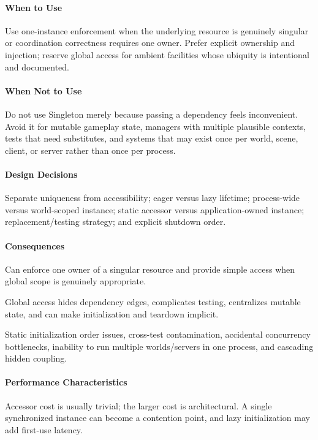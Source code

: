 \documentclass[11pt]{article}
\begin{document}
\paragraph{When to Use} Use one-instance enforcement when the underlying resource is genuinely singular or coordination correctness requires one owner. Prefer explicit ownership and injection; reserve global access for ambient facilities whose ubiquity is intentional and documented.
\paragraph{When Not to Use} Do not use Singleton merely because passing a dependency feels inconvenient. Avoid it for mutable gameplay state, managers with multiple plausible contexts, tests that need substitutes, and systems that may exist once per world, scene, client, or server rather than once per process.
\paragraph{Design Decisions} Separate uniqueness from accessibility; eager versus lazy lifetime; process-wide versus world-scoped instance; static accessor versus application-owned instance; replacement/testing strategy; and explicit shutdown order.
\paragraph{Consequences}
\begin{description}[leftmargin=2.7cm,style=nextline]
\item[Benefits] Can enforce one owner of a singular resource and provide simple access when global scope is genuinely appropriate.
\item[Costs] Global access hides dependency edges, complicates testing, centralizes mutable state, and can make initialization and teardown implicit.
\item[Risks] Static initialization order issues, cross-test contamination, accidental concurrency bottlenecks, inability to run multiple worlds/servers in one process, and cascading hidden coupling.
\end{description}
\paragraph{Performance Characteristics} Accessor cost is usually trivial; the larger cost is architectural. A single synchronized instance can become a contention point, and lazy initialization may add first-use latency.
\end{document}
